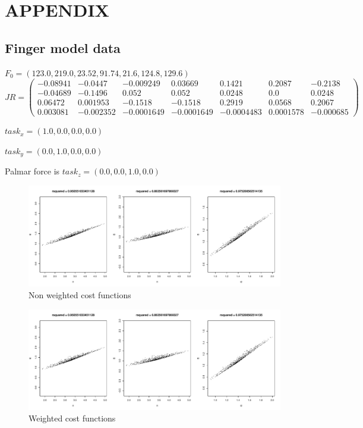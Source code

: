 \section{APPENDIX}

\subsection{Finger model data}
$F_0 = (123.0, 219.0, 23.52, 91.74,	21.6, 124.8, 129.6)$\\
$
JR = 
\begin{pmatrix}
-0.08941 & -0.0447 & -0.009249 & 0.03669 & 0.1421 & 0.2087 & -0.2138 \\
-0.04689 & -0.1496 & 0.052 &0.052 & 0.0248 & 0.0 & 0.0248 \\ 
0.06472 & 0.001953 & -0.1518 &-0.1518 & 0.2919 & 0.0568 & 0.2067 \\
0.003081 & -0.002352 & -0.0001649 & -0.0001649 & -0.0004483 & 0.0001578 & -0.000685
\end{pmatrix}$

$task_x = (1.0,0.0,0.0,0.0)$

$task_y = (0.0,1.0,0.0,0.0)$

Palmar force is $task_z = (0.0,0.0,1.0,0.0)$


\begin{figure}[h]
\centering
\includegraphics[width=\textwidth,page=1]{figs/cost_function_scatterplots.pdf}
\caption{Non weighted cost functions}
\label{fig:unweighted_cost_functions}
\end{figure}

\begin{figure}[h]
\centering
\includegraphics[width=\textwidth,page=2]{figs/cost_function_scatterplots.pdf}
\caption{Weighted cost functions}
\label{fig:weighted_cost_functions}
\end{figure}
